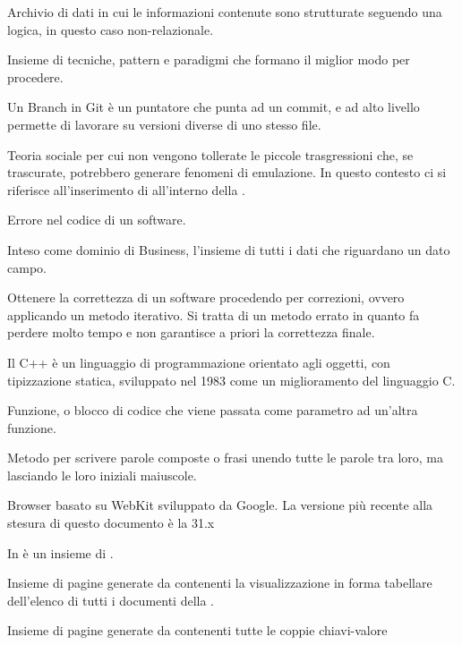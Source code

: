 Archivio di dati in cui le informazioni contenute sono strutturate seguendo una logica, in questo caso non-relazionale.

Insieme di tecniche, pattern e paradigmi che formano il miglior modo per procedere.

Un Branch in Git è un puntatore che punta ad un commit, e ad alto livello permette di lavorare su versioni diverse di uno stesso file.

Teoria sociale per cui non vengono tollerate le piccole trasgressioni che, se trascurate, potrebbero generare fenomeni di emulazione. In questo contesto ci si riferisce all'inserimento di  all'interno della . 

Errore nel codice di un software.

Inteso come dominio di Business, l'insieme di tutti i dati che riguardano un dato campo.

Ottenere la correttezza di un software procedendo per correzioni, ovvero applicando un metodo iterativo. Si tratta di un metodo errato in quanto fa perdere molto tempo e non garantisce a priori la correttezza finale.


Il C++ è un linguaggio di programmazione orientato agli oggetti, con tipizzazione statica, sviluppato nel 1983 come un miglioramento del linguaggio C.

Funzione, o blocco di codice che viene passata come parametro ad un'altra funzione.

Metodo per scrivere parole composte o frasi unendo tutte le parole tra loro, ma lasciando le loro iniziali maiuscole.

Browser basato su WebKit sviluppato da Google. La versione più recente alla stesura di questo documento è la 31.x

In  è un insieme di .

Insieme di pagine generate da \ProjectName{} contenenti la visualizzazione in forma tabellare dell'elenco di tutti i documenti della  .

Insieme di pagine generate da \ProjectName{} contenenti tutte le coppie chiavi-valore

